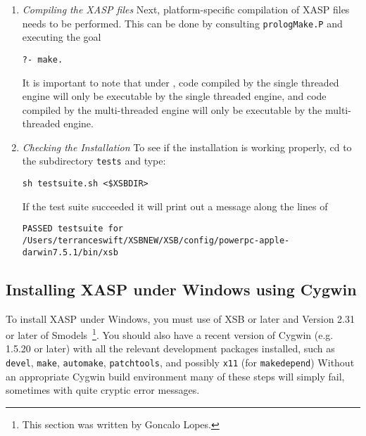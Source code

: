 \begin{enumerate}
\item {\em Compiling the XASP files} Next, platform-specific
  compilation of XASP files needs to be performed.  This can be done
  by consulting {\tt prologMake.P} and executing the goal
\begin{center}
  {\tt ?- make.}
\end{center}
It is important to note that under \version{}, code compiled by the
single threaded engine will only be executable by the single threaded
engine, and code compiled by the multi-threaded engine will only be
executable by the multi-threaded engine.
%
\item {\em Checking the Installation} 
%
To see if the installation is working properly, cd to the subdirectory
{\tt tests} and type: 

{\tt sh testsuite.sh <\$XSBDIR>}

If the test suite succeeded it will print out a message along the lines of 

\begin{small}
{\tt PASSED testsuite for /Users/terranceswift/XSBNEW/XSB/config/powerpc-apple-darwin7.5.1/bin/xsb}
\end{small}

\end{enumerate}

\subsection{Installing XASP under Windows using Cygwin}

To install XASP under Windows, you must use \version{} of XSB or later
and Version 2.31 or later of Smodels~\footnote{This section was
  written by Goncalo Lopes.}.  You should also have a recent version
of Cygwin (e.g. 1.5.20 or later) with all the relevant development
packages installed, such as {\tt devel}, {\tt make}, {\tt automake},
{\tt patchtools}, and possibly {\tt x11} (for {\tt makedepend})
Without an appropriate Cygwin build environment many of these steps
will simply fail, sometimes with quite cryptic error messages.

